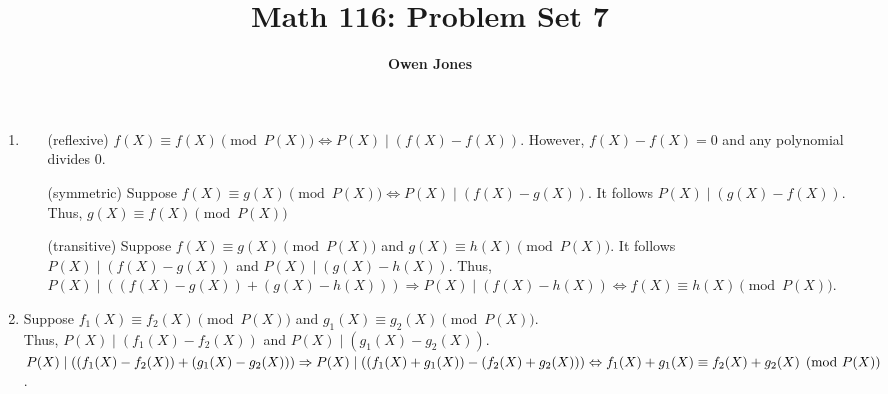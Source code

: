 \documentclass[10pt]{article}
\title{\bf Math 116: Problem Set 7}
\author{\bf Owen Jones}
\begin{document}
\maketitle
\begin{enumerate}[label= \arabic*.]
    \item \begin{enumerate}
        \item [(reflexive)] $f(X)\equiv f(X)\pmod{P(X)}\Leftrightarrow P(X)\mid (f(X)-f(X))$. However, $f(X)-f(X)=0$ and any polynomial divides $0$.
        \item [(symmetric)] Suppose $f(X)\equiv g(X)\pmod{P(X)}\Leftrightarrow P(X)\mid (f(X)-g(X))$. It follows $P(X)\mid (g(X)-f(X))$. Thus, $g(X)\equiv f(X)\pmod{P(X)}$
        \item [(transitive)] Suppose $f(X)\equiv g(X)\pmod{P(X)}$ and $g(X)\equiv h(X)\pmod{P(X)}$. It follows $P(X)\mid (f(X)-g(X))$ and $P(X)\mid (g(X)-h(X))$. Thus, $P(X)\mid ((f(X)-g(X))+(g(X)-h(X)))\Rightarrow P(X)\mid(f(X)-h(X))\Leftrightarrow f(X)\equiv h(X)\pmod{P(X)}$.
    \end{enumerate}
    \item Suppose $f_1(X)\equiv f_2(X)\pmod{P(X)}$ and $g_1(X)\equiv g_2(X)\pmod{P(X)}$.\\
    Thus, $P(X)\mid(f_1(X)-f_2(X))$ and $P(X)\mid(g_1(X)-g_2(X))$.\\

    $P(X)\mid((f_1(X)-f_2(X))+(g_1(X)-g_2(X)))\\
    \Rightarrow P(X)\mid((f_1(X)+g_1(X))-(f_2(X)+g_2(X)))\\
    \Leftrightarrow f_1(X)+g_1(X)\equiv f_2(X)+g_2(X)\pmod{P(X)}$.\\
    

\end{enumerate}
\end{document}
